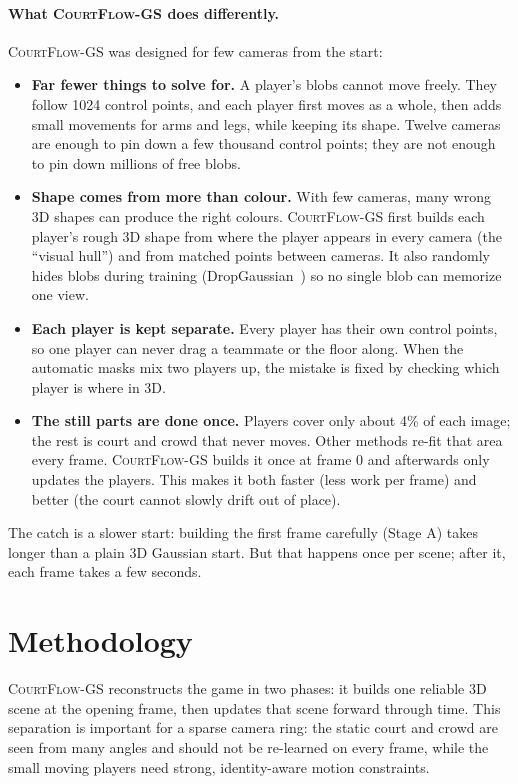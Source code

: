 \documentclass[11pt]{article}
\newcommand{\method}{\textsc{CourtFlow-GS}\xspace}
\begin{document}
\paragraph{What \method does differently.}
\method was designed for few cameras from the start:
\begin{itemize}
\item \textbf{Far fewer things to solve for.} A player's blobs cannot move freely. They follow 1024
control points, and each player first moves as a whole, then adds small movements for arms and
legs, while keeping its shape. Twelve cameras are enough to pin down a few thousand control points;
they are not enough to pin down millions of free blobs.
\item \textbf{Shape comes from more than colour.} With few cameras, many wrong 3D shapes can produce
the right colours. \method first builds each player's rough 3D shape from where the player appears
in every camera (the ``visual hull'') and from matched points between cameras. It also randomly
hides blobs during training (DropGaussian~\cite{park2025dropgaussian}) so no single blob can
memorize one view.
\item \textbf{Each player is kept separate.} Every player has their own control points, so one
player can never drag a teammate or the floor along. When the automatic masks mix two players up,
the mistake is fixed by checking which player is where in 3D.
\item \textbf{The still parts are done once.} Players cover only about 4\% of each image; the rest is
court and crowd that never moves. Other methods re-fit that area every frame. \method builds it
once at frame 0 and afterwards only updates the players. This makes it both faster (less work per
frame) and better (the court cannot slowly drift out of place).
\end{itemize}
The catch is a slower start: building the first frame carefully (Stage A) takes longer than a plain
3D Gaussian start. But that happens once per scene; after it, each frame takes a few seconds.

\section{Methodology}
\method reconstructs the game in two phases: it builds one reliable 3D scene at the opening frame,
then updates that scene forward through time. This separation is important for a sparse camera ring:
the static court and crowd are seen from many angles and should not be re-learned on every frame,
while the small moving players need strong, identity-aware motion constraints.
\end{document}
